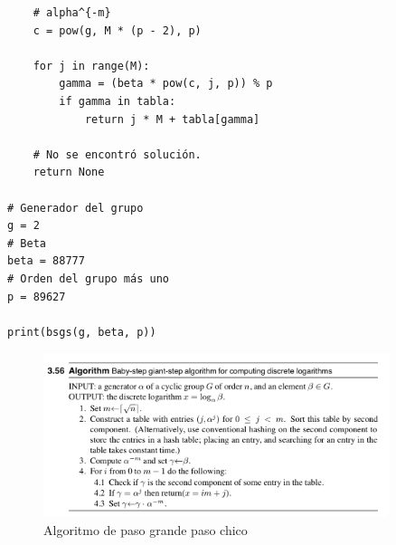 \documentclass[11pt,letterpaper]{article}
\begin{document}
\begin{enumerate}[label=\alph*)]
\begin{verbatim}
    # alpha^{-m}
    c = pow(g, M * (p - 2), p)

    for j in range(M):
        gamma = (beta * pow(c, j, p)) % p
        if gamma in tabla:
            return j * M + tabla[gamma]

    # No se encontró solución.
    return None

# Generador del grupo
g = 2
# Beta
beta = 88777
# Orden del grupo más uno
p = 89627

print(bsgs(g, beta, p))
\end{verbatim}


\begin{figure}[h]
\caption{Algoritmo de paso grande paso chico}
\centering
\includegraphics[width=0.9\textwidth]{assets/3b.png}
\end{figure}


\end{enumerate}
\end{document}
